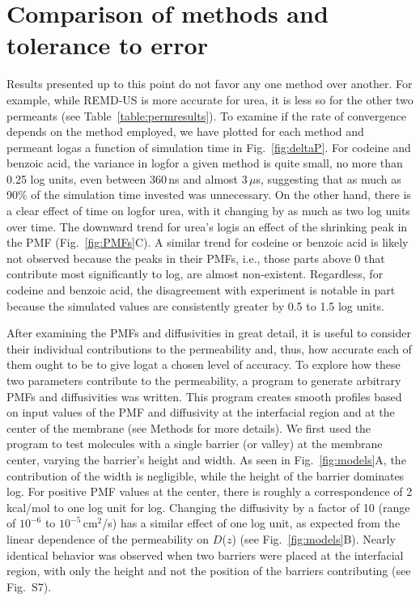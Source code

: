 \section{Comparison of methods and tolerance to error}
\par Results presented up to this point do not favor any one method over another.  For example, while REMD-US is more accurate for urea, it is less so for the other two permeants (see Table~\ref{table:permresults}).  To examine if the rate of convergence depends on the method employed, we have plotted for each method and permeant log\perm as a function of simulation time in Fig.~\ref{fig:deltaP}.  For codeine and benzoic acid, the variance in log\perm for a given method is quite small, no more than 0.25 log units, even between 360\,ns and almost 3\,$\mu$s, suggesting that as much as 90\% of the simulation time invested was unnecessary.  On the other hand, there is a clear effect of time on log\perm for urea, with it changing by as much as two log units over time.   The downward trend for urea's log\perm is an effect of the shrinking peak in the PMF (Fig.~\ref{fig:PMFs}C).   A similar trend for codeine or benzoic acid is likely not observed because the peaks in their PMFs, i.e., those parts above 0 that contribute most significantly to log\perm, are almost non-existent.   Regardless, for codeine and benzoic acid, the disagreement with experiment is notable in part because the simulated values are consistently greater by 0.5 to 1.5 log units.


\par After examining the PMFs and diffusivities in great detail, it is useful to consider their individual contributions to the permeability and, thus, how accurate each of them ought to be to give log\perm at a chosen level of accuracy.  To explore how these two parameters contribute to the permeability, a program to generate arbitrary PMFs and diffusivities was written.  This program creates smooth profiles based on input values of the PMF and diffusivity at the interfacial region and at the center of the membrane (see Methods for more details).  We first used the program to test molecules with a single barrier (or valley) at the membrane center, varying the barrier's height and width.  As seen in Fig.~\ref{fig:models}A, the contribution of the width is negligible, while the height of the barrier dominates log\perm.  For positive PMF values
at the center, there is roughly a correspondence of 2\,kcal/mol to one log unit for log\perm.  Changing the diffusivity by a factor of 10 (range of $10^{-6}$ to $10^{-5}$\,cm$^2$/s) has a similar effect of one log unit, as expected from the linear dependence of the permeability on $D$($z$) (see Fig.~\ref{fig:models}B).  Nearly identical behavior was observed when two barriers were placed at the interfacial region, with only the height and not the position of the barriers contributing (see Fig.~S7).

